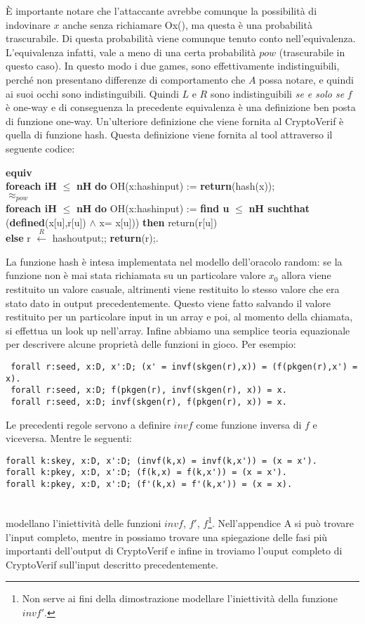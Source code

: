 \documentclass[a4paper,openright,twoside,12pt]{report}
\newcommand{\foreach}[2]{\textbf{foreach #1} $\leq$ \textbf{#2} \textbf{do}}
\newcommand{\return}[1]{\textbf{return}(#1);}
\newcommand{\setR}[2]{#1 $\xleftarrow{R}$ #2;}
\newcommand{\find}[6]{\textbf{find #1} $\leq$ \textbf{#2 suchthat} (\textbf{defined}(#3) $\wedge$ #4)) \textbf{then} #5 \\ \textbf{else} #6}
\newcommand{\equiva}{\textbf{equiv}}
\begin{document}
\`E importante notare che l'attaccante avrebbe comunque la possibilit\`a di indovinare $x$ anche senza richiamare Ox(), ma questa \`e una probabilit\`a trascurabile. 
Di questa probabilit\`a viene comunque tenuto conto nell'equivalenza. L'equivalenza infatti, vale a meno di una certa probabilit\`a $pow$ (trascurabile in questo caso).
In questo modo i due games, sono effettivamente indistinguibili, perch\'e non presentano differenze di comportamento che $A$ possa notare, e quindi ai suoi occhi sono indistinguibili.
Quindi $L$ e $R$ sono indistinguibili \emph{se e solo se} $f$ \`e one-way e di conseguenza la precedente equivalenza \`e una definizione ben posta di funzione one-way.
Un'ulteriore definizione che viene fornita al CryptoVerif \`e quella di funzione hash. Questa definizione viene fornita al tool attraverso il seguente codice:

 \equiva \\ 
  \foreach{iH}{nH} OH(x:hashinput) := \return{hash(x)}\\
    \textbf{$\approx _{pow}$}\\  
     \foreach{iH}{nH} OH(x:hashinput) :=
   \find{u}{nH}{x[u],r[u]}{x= x[u]}{return(r[u])}{\setR{r}{hashoutput}; \return{r}.}
 
La funzione hash \`e intesa implementata nel modello dell'oracolo random: se la funzione non \`e mai stata richiamata su un particolare valore $x_0$ allora viene restituito un valore casuale, 
altrimenti viene restituito lo stesso valore che era stato dato in output precedentemente. Questo viene fatto salvando il valore restituito per un particolare input in un array e poi,
al momento della chiamata, si effettua un look up nell'array.
Infine abbiamo una semplice teoria equazionale per descrivere alcune propriet\`a delle funzioni in gioco.
Per esempio:
\begin{verbatim}
 forall r:seed, x:D, x':D; (x' = invf(skgen(r),x)) = (f(pkgen(r),x') = x).
 forall r:seed, x:D; f(pkgen(r), invf(skgen(r), x)) = x.
 forall r:seed, x:D; invf(skgen(r), f(pkgen(r), x)) = x.
\end{verbatim}
Le precedenti regole servono a definire $invf$ come funzione inversa di $f$ e viceversa. Mentre le seguenti:
\begin{verbatim}
forall k:skey, x:D, x':D; (invf(k,x) = invf(k,x')) = (x = x').
forall k:pkey, x:D, x':D; (f(k,x) = f(k,x')) = (x = x').
forall k:pkey, x:D, x':D; (f'(k,x) = f'(k,x')) = (x = x).
\end{verbatim}\\
modellano l'iniettivit\`a delle funzioni $invf$, $f'$, $f$\footnote{Non serve ai fini della dimostrazione modellare l'iniettivit\`a della funzione $invf'$.}.
Nell'appendice A si pu\`o trovare l'input completo, mentre in \cite{BlanchetPointchevalCrypto06} possiamo trovare una spiegazione delle fasi 
pi\`u importanti dell'output di CryptoVerif e infine in \cite{fdhall} troviamo l'ouput completo di CryptoVerif sull'input descritto precedentemente.
\end{document}
